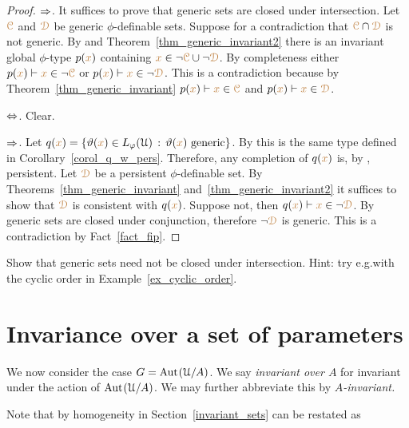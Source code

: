 \begin{proof}
  $\Rightarrow$.
  It suffices to prove that generic sets are closed under intersection.
  Let ${\color{brown}\EuScript C}$ and ${\color{brown}\EuScript D}$ be generic $\phi$-definable sets.
  Suppose for a contradiction that ${\color{brown}\EuScript C}\cap{\color{brown}\EuScript D}$ is not generic.
  By  and Theorem~\ref{thm_generic_invariant2} there is an invariant global $\phi$-type $p({\color{brown} x})$ containing ${\color{brown} x}\in\neg{\color{brown}\EuScript C}\cup\neg{\color{brown}\EuScript D}$.
  By completeness either $p({\color{brown} x})\vdash{\color{brown}x}\in\neg{\color{brown}\EuScript C}$ or $p({\color{brown} x})\vdash{\color{brown}x}\in\neg{\color{brown}\EuScript D}$.
  This is a contradiction because by Theorem~\ref{thm_generic_invariant} $p({\color{brown} x})\vdash{\color{brown}x}\in{\color{brown}\EuScript C}$ and $p({\color{brown} x})\vdash{\color{brown}x}\in{\color{brown}\EuScript D}$.

  $\Leftrightarrow$. Clear.

  $\Rightarrow$.
  Let $q({\color{brown} x})=\{\vartheta({\color{brown} x})\in L_\varphi(\EuScript U)\,:\,\vartheta({\color{brown} x})\textrm{ generic}\}$.
  By  this is the same type defined in Corollary~\ref{corol_q_w_pers}.
  Therefore, any completion of $q({\color{brown} x})$ is, by , persistent.
  Let ${\color{brown}\EuScript D}$ be a persistent $\phi$-definable set.
  By Theorems~\ref{thm_generic_invariant} and~\ref{thm_generic_invariant2} it suffices to show that ${\color{brown}\EuScript D}$ is consistent with $q({\color{brown} x})$.
  Suppose not, then $q({\color{brown} x})\vdash {\color{brown}x}\in\neg{\color{brown}\EuScript D}$.
  By  generic sets are closed under conjunction, therefore $\neg{\color{brown}\EuScript D}$ is generic.
  This is a contradiction by Fact~\ref{fact_fip}.
\end{proof}

\begin{exercise}
  Show that generic sets need not be closed under intersection.
  Hint: try e.g.\@ with the cyclic order in Example~\ref{ex_cyclic_order}.
\end{exercise}

\section{Invariance over a set of parameters}

We now consider the case $G={\rm Aut\kern.15ex}(\EuScript U/A)$.
We say \emph{invariant over $A$\/} for invariant under the action of ${\rm Aut\kern.15ex}(\EuScript U/A)$.
We may further abbreviate this by \emph{$A$-invariant.}

Note that by homogeneity  in Section~\ref{invariant_sets} can  be restated as

